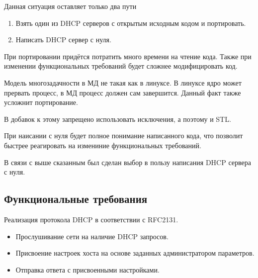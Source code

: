 \documentclass[12pt]{article}
\begin{document}
Данная ситуация оставляет только два пути

\begin{enumerate}
    \item Взять один из DHCP серверов с открытым исходным кодом и портировать.
    \item Написать DHCP сервер с нуля.
\end{enumerate}

При портировании придётся потратить много времени на чтение кода.
Также при изменении функциональных требований будет сложнее модифицировать код.

Модель многозадачности в МД не такая как в линуксе.
В линуксе ядро может прервать процесс, в МД процесс должен сам завершится.
Данный факт также усложнит портирование.

В добавок к этому запрещено использовать исключения, а поэтому и STL.

При наисании с нуля будет полное понимание написанного кода, что позволит быстрее реагировать на измениние функциональных требований.

В связи с выше сказанным был сделан выбор в пользу написания DHCP сервера с нуля.

\subsection{Функциональные требования}

Реализация протокола DHCP в соответствии с RFC2131.
\begin{itemize}
    \item Прослушивание сети на наличие DHCP запросов.
    \item Присвоение настроек хоста на основе заданных администратором параметров.
    \item Отправка ответа с присвоенными настройками.
\end{itemize}
\end{document}
